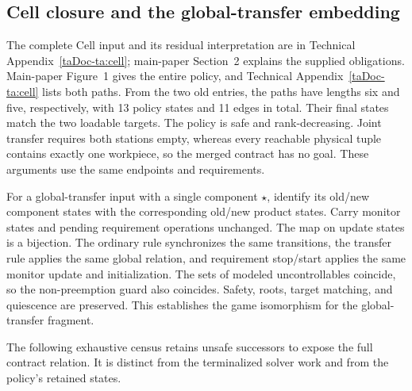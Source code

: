 \documentclass[11pt]{article}
\begin{document}
\subsection{Cell closure and the global-transfer embedding}
\label{supp:cell-finite}
The complete Cell input and its residual interpretation are in Technical Appendix~\ref{taDoc-ta:cell}; main-paper Section~2 explains the supplied obligations. Main-paper Figure~1 gives the entire policy, and Technical Appendix~\ref{taDoc-ta:cell} lists both paths. From the two old entries, the paths have lengths six and five, respectively, with 13 policy states and 11 edges in total. Their final states match the two loadable targets. The policy is safe and rank-decreasing. Joint transfer requires both stations empty, whereas every reachable physical tuple contains exactly one workpiece, so the merged contract has no goal. These arguments use the same endpoints and requirements.

For a global-transfer input with a single component $\star$, identify its old/new component states with the corresponding old/new product states. Carry monitor states and pending requirement operations unchanged. The map on update states is a bijection. The ordinary rule synchronizes the same transitions, the transfer rule applies the same global relation, and requirement stop/start applies the same monitor update and initialization. The sets of modeled uncontrollables coincide, so the non-preemption guard also coincides. Safety, roots, target matching, and quiescence are preserved. This establishes the game isomorphism for the global-transfer fragment.

The following exhaustive census retains unsafe successors to expose the full contract relation. It is distinct from the terminalized solver work and from the policy's retained states.
\end{document}
